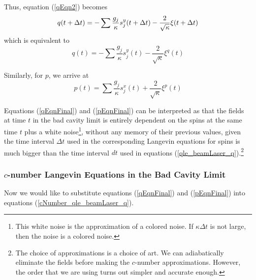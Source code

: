 \documentclass{article}
\begin{document}
Thus, equation (\ref{qEqn2}) becomes
\begin{equation}
    \notag q(t+\Delta t) = -\sum\frac{g_j}{\kappa}s_j^y(t+\Delta t)-\frac{2}{\sqrt{\kappa}}\xi(t+\Delta t)
\end{equation}
which is equivalent to 
\begin{equation}
    \label{qEqnFinal}
    q(t) = -\sum\frac{g_j}{\kappa}s_j^y(t)-\frac{2}{\sqrt{\kappa}}\xi^q(t)
\end{equation}

Similarly, for $p$, we arrive at
\begin{equation}
     \label{pEqnFinal}
    p(t) = \sum\frac{g_j}{\kappa}s_j^x(t)+\frac{2}{\sqrt{\kappa}}\xi^p(t)
\end{equation}

Equations (\ref{qEqnFinal}) and (\ref{pEqnFinal}) can be interpreted as that the fields at time $t$ in the bad cavity limit is entirely dependent on the spins at the same time $t$ plus a white noise\footnote{This white noise is the approximation of a colored noise. If $\kappa \Delta t$ is not large, then the noise is a colored noise.}, without any memory of their previous values, given the time interval $\Delta t$ used in the corresponding Langevin equations for spins is much bigger than the time interval $dt$ used in equations (\ref{qle_beamLaser_q}).\footnote{The choice of approximations is a choice of art. We can adiabatically eliminate the fields before making the $c$-number approximations. However, the order that we are using turns out simpler and accurate enough.}

\subsubsection{$c$-number Langevin Equations in the Bad Cavity Limit}
Now we would like to substitute equations (\ref{qEqnFinal}) and (\ref{pEqnFinal}) into equations (\ref{cNumber_qle_beamLaser_q}). 
\end{document}
